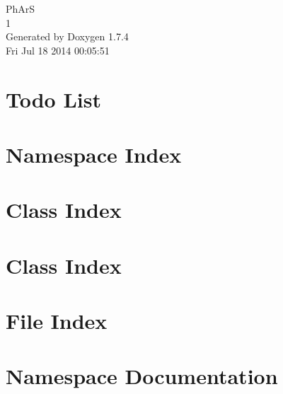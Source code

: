 \documentclass[a4paper]{book}
\begin{document}
\hypersetup{pageanchor=false}
\begin{titlepage}
\vspace*{7cm}
\begin{center}
{\Large PhArS \\[1ex]\large 1 }\\
\vspace*{1cm}
{\large Generated by Doxygen 1.7.4}\\
\vspace*{0.5cm}
{\small Fri Jul 18 2014 00:05:51}\\
\end{center}
\end{titlepage}
\clearemptydoublepage
{}
\tableofcontents
\clearemptydoublepage
{}
\hypersetup{pageanchor=true}
\chapter{Todo List}
\label{todo}
\hypertarget{todo}{}

\chapter{Namespace Index}

\chapter{Class Index}

\chapter{Class Index}

\chapter{File Index}

\chapter{Namespace Documentation}









\end{document}
